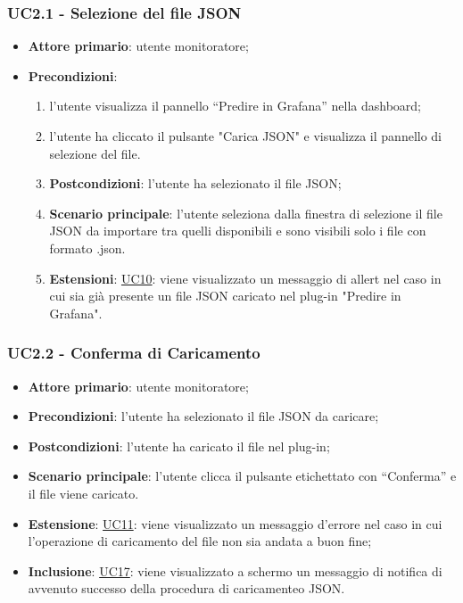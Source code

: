 		
		\label{par:UC2.1}
		\subsubsection{UC2.1 - Selezione del file JSON}
		\begin{itemize}
			\item\textbf{Attore primario}: utente monitoratore;
			\item\textbf{Precondizioni}:
				\begin{enumerate}
					\item l’utente visualizza il pannello “Predire in Grafana” nella dashboard;
					\item l’utente ha cliccato il pulsante "Carica JSON" e visualizza il pannello di selezione del file.
			\item\textbf{Postcondizioni}: l’utente ha selezionato il file JSON;
			\item\textbf{Scenario principale}: l’utente seleziona dalla finestra di selezione il file JSON da importare tra quelli disponibili e sono visibili solo i file con formato .json.
			\item\textbf{Estensioni}: \hyperref[par:UC10]{UC10}: viene visualizzato un messaggio di allert nel caso in cui sia già presente un file JSON caricato nel plug-in "Predire in Grafana".
				\end{enumerate}
			\end{itemize}
		
		\label{par:UC2.2}
		\subsubsection{UC2.2 - Conferma di Caricamento}
		\begin{itemize}
			\item\textbf{Attore primario}: utente monitoratore;
			\item\textbf{Precondizioni}: l’utente ha selezionato il file JSON da caricare;
			\item\textbf{Postcondizioni}: l’utente ha caricato il file nel plug-in; 
			\item\textbf{Scenario principale}: l’utente clicca il pulsante etichettato con “Conferma” e il file viene caricato.
			\item\textbf{Estensione}: \hyperref[par:UC11]{UC11}: viene visualizzato un messaggio d’errore nel caso in cui l’operazione di caricamento del file non sia andata a buon fine;				
			\item\textbf{Inclusione}: \hyperref[par:UC17]{UC17}: viene visualizzato a schermo un messaggio di notifica di avvenuto successo della procedura di caricamenteo JSON.	
		\end{itemize}

